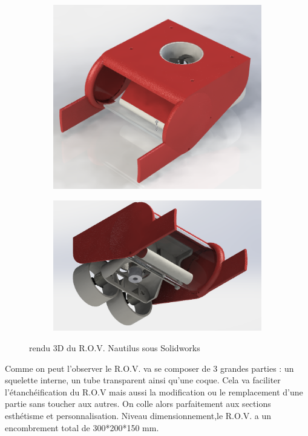 \documentclass[a4paper,11pt]{report}
\begin{document}
					\begin{figure}[!h]
						\centering
							\begin{subfigure}[b]{0.4\textwidth}
								\includegraphics[width=\textwidth]{Photos/Capture3.png}
							\end{subfigure}
							\begin{subfigure}[b]{0.4\textwidth}
								\includegraphics[width=\textwidth]{Photos/Capture4.png}
							\end{subfigure}
							\caption{rendu 3D du R.O.V. Nautilus sous Solidworks}
					\end{figure}
					
					Comme on peut l'observer le R.O.V. va se composer de 3 grandes parties : un squelette interne, un tube transparent ainsi qu'une coque. Cela va faciliter l'étanchéification du R.O.V mais aussi la modification ou le remplacement d'une partie sans toucher aux autres. On colle alors parfaitement aux sections esthétisme et personnalisation. Niveau dimensionnement,le R.O.V. a un encombrement total de 300*200*150 mm. 
						\newline
						\newline
					
\end{document}
